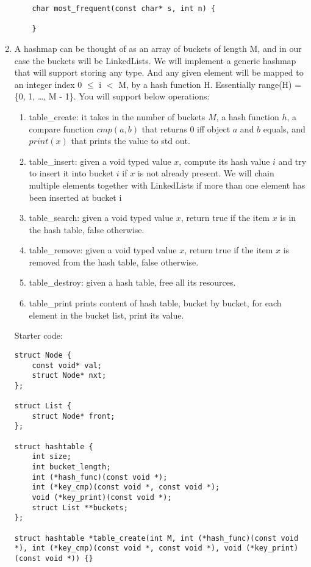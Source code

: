 \documentclass{article}
\begin{document}
\begin{enumerate}
    \begin{lstlisting}
    char most_frequent(const char* s, int n) {
    
    }
    \end{lstlisting}

    \newpage
    \item A hashmap can be thought of as an array of buckets of length M, and in our case the buckets will be LinkedLists. We will implement a generic hashmap that will support storing any type. And any given element will be mapped to an integer index 0 $\leq$ i $<$ M, by a hash function H. Essentially range(H) = \{0, 1, …, M - 1\}. You will support below operations:
    \begin{enumerate}[label=\alph*.]
        \item  table\_create: it takes in the number of buckets \( M \), a hash function \( h \), a compare function \( cmp(a, b) \) that returns 0 iff object \( a \) and \( b \) equals, and \( print(x) \) that prints the value to std out.
        \item table\_insert: given a void typed value \( x \), compute its hash value \( i \) and try to insert it into bucket \( i \) if \( x \) is not already present. We will chain multiple elements together with LinkedLists if more than one element has been inserted at bucket i
        \item table\_search: given a void typed value \( x \), return true if the item \( x \) is in the hash table, false otherwise.
        \item table\_remove: given a void typed value \( x \), return true if the item \( x \) is removed from the hash table, false otherwise.
        \item table\_destroy: given a hash table, free all its resources.
        \item table\_print prints content of hash table, bucket by bucket, for each element in the bucket list, print its value.
    \end{enumerate}
    Starter code: 
    \begin{lstlisting}
struct Node {
    const void* val;
    struct Node* nxt;
};

struct List {
    struct Node* front;
};

struct hashtable {
    int size;
    int bucket_length;
    int (*hash_func)(const void *);
    int (*key_cmp)(const void *, const void *);
    void (*key_print)(const void *);
    struct List **buckets;
};

struct hashtable *table_create(int M, int (*hash_func)(const void *), int (*key_cmp)(const void *, const void *), void (*key_print)(const void *)) {}


\end{lstlisting}
\end{enumerate}
\end{document}
